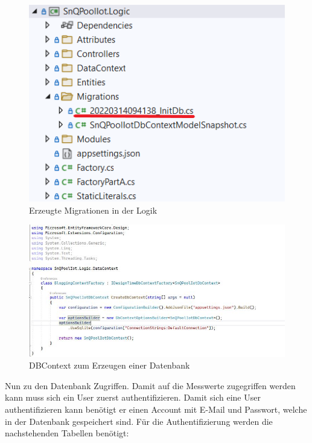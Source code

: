 \begin{figure}[H]
    \centering
    \includegraphics[width=1\textwidth]{pics/MigrationCreated.png}
    \caption{Erzeugte Migrationen in der Logik}
\end{figure}

\begin{figure}[H]
    \centering
    \includegraphics[width=1\textwidth]{pics/DBContext.JPG}
    \caption{DBContext zum Erzeugen einer Datenbank}
\end{figure}

Nun zu den Datenbank Zugriffen. Damit auf die Messwerte zugegriffen werden kann muss sich ein User zuerst authentifizieren.
Damit sich eine User authentifizieren kann benötigt er einen Account mit E-Mail und Passwort, welche in der Datenbank gespeichert sind.
Für die Authentifizierung werden die nachstehenden Tabellen benötigt:

